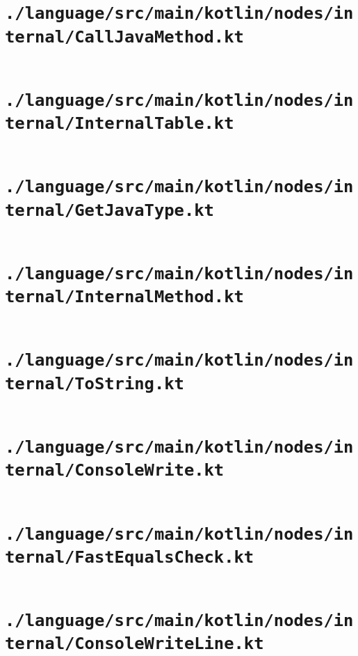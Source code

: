 \documentclass[a4paper, 11pt]{report}
\begin{document}
    \section{\lstinline{./language/src/main/kotlin/nodes/internal/CallJavaMethod.kt}}
    \inputminted{kotlin}{./language/src/main/kotlin/nodes/internal/CallJavaMethod.kt}


    \section{\lstinline{./language/src/main/kotlin/nodes/internal/InternalTable.kt}}
    \inputminted{kotlin}{./language/src/main/kotlin/nodes/internal/InternalTable.kt}


    \section{\lstinline{./language/src/main/kotlin/nodes/internal/GetJavaType.kt}}
    \inputminted{kotlin}{./language/src/main/kotlin/nodes/internal/GetJavaType.kt}


    \section{\lstinline{./language/src/main/kotlin/nodes/internal/InternalMethod.kt}}
    \inputminted{kotlin}{./language/src/main/kotlin/nodes/internal/InternalMethod.kt}


    \section{\lstinline{./language/src/main/kotlin/nodes/internal/ToString.kt}}
    \inputminted{kotlin}{./language/src/main/kotlin/nodes/internal/ToString.kt}


    \section{\lstinline{./language/src/main/kotlin/nodes/internal/ConsoleWrite.kt}}
    \inputminted{kotlin}{./language/src/main/kotlin/nodes/internal/ConsoleWrite.kt}


    \section{\lstinline{./language/src/main/kotlin/nodes/internal/FastEqualsCheck.kt}}
    \inputminted{kotlin}{./language/src/main/kotlin/nodes/internal/FastEqualsCheck.kt}


    \section{\lstinline{./language/src/main/kotlin/nodes/internal/ConsoleWriteLine.kt}}
    \inputminted{kotlin}{./language/src/main/kotlin/nodes/internal/ConsoleWriteLine.kt}
\end{document}

